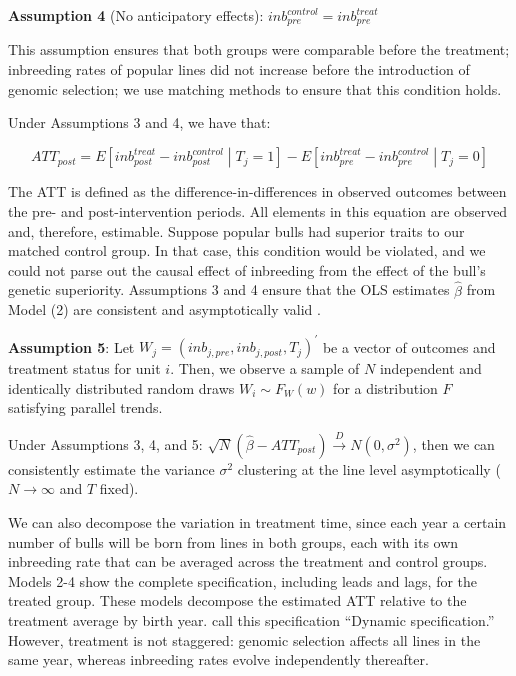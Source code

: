 \documentclass[12pt,letterpaper]{article}
\begin{document}
\medskip
\textbf{Assumption 4} (No anticipatory effects): $inb_{pre}^{control}=inb_{pre}^{treat}$

This assumption ensures that both groups were comparable before the treatment; inbreeding rates of popular lines did not increase before the introduction of genomic selection; we use matching methods to ensure that this condition holds. 

Under Assumptions 3 and 4, we have that:

\begin{equation}
    ATT_{post}=E\left[inb_{post}^{treat}-inb_{post}^{control} \middle| T_{j}=1\right]-E\left[inb_{pre}^{treat}-inb_{pre}^{control} \middle| T_{j}=0\right]
\end{equation}

The ATT is defined as the difference-in-differences in observed outcomes between the pre- and post-intervention periods. All elements in this equation are observed and, therefore, estimable. Suppose popular bulls had superior traits to our matched control group. In that case, this condition would be violated, and we could not parse out the causal effect of inbreeding from the effect of the bull's genetic superiority. Assumptions 3 and 4 ensure that the OLS estimates $\hat{\beta}$ from Model (2) are consistent and asymptotically valid \citep{Roth2023}.

\medskip
\textbf{Assumption 5}: Let $W_{j}=(inb_{j,pre}, inb_{j,post}, T_{j})^{'}$ be a vector of outcomes and treatment status for unit $i$. Then, we observe a sample of $N$  independent and identically distributed random draws $W_{i}\sim F_{W}(w)$ for a distribution $F$ satisfying parallel trends.

Under Assumptions 3, 4, and 5: $\sqrt{N}(\hat{\beta}-ATT_{post})\overset{D}{\rightarrow} N(0, \sigma^{2})$, then we can consistently estimate the variance $\sigma^{2}$ clustering at the line level \citep{Bertrand2004} asymptotically ($N\rightarrow\infty$ and $T$ fixed).

We can also decompose the variation in treatment time, since each year a certain number of bulls will be born from lines in both groups, each with its own inbreeding rate that can be averaged across the treatment and control groups. Models 2-4 show the complete specification, including leads and lags, for the treated group. These models decompose the estimated ATT relative to the treatment average by birth year. \cite{Sun2021} call this specification ``Dynamic specification.'' However, treatment is not staggered: genomic selection affects all lines in the same year, whereas inbreeding rates evolve independently thereafter. 
\end{document}
